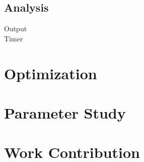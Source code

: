 \documentclass{article}
\begin{document}
\subsection{Analysis}
\begin{description}
\item[Output]
\item[Timer]
\end{description} 
	
\section{Optimization}
\section{Parameter Study} 
\section{Work Contribution} 
\end{document}
